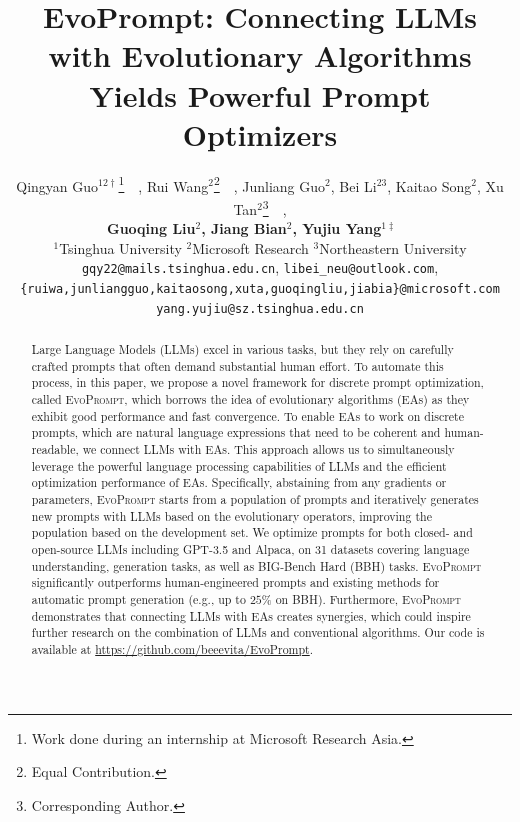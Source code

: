 \documentclass{article} %
\title{EvoPrompt: Connecting LLMs with Evolutionary Algorithms Yields Powerful Prompt Optimizers}
\author{Qingyan Guo$^{12\dag}$\thanks{Work done during an internship at Microsoft Research Asia.
}~~,
Rui Wang$^{2}$\thanks{Equal Contribution.}~~, Junliang Guo$^{2}$, Bei Li$^{23}$, Kaitao Song$^{2}$, Xu Tan$^{2}$\thanks{Corresponding Author.}~~,\\
\textbf{
Guoqing Liu$^{2}$, Jiang Bian$^{2}$, 
Yujiu Yang$^{1\ddag}$~~ } \\
$^1$Tsinghua University\quad 
$^2$Microsoft Research\quad 
$^3$Northeastern University \\
\texttt{gqy22@mails.tsinghua.edu.cn},
\texttt{libei\_neu@outlook.com},\\
\texttt{\{ruiwa,junliangguo,kaitaosong,xuta,guoqingliu,jiabia\}@microsoft.com}\\
\texttt{yang.yujiu@sz.tsinghua.edu.cn}
}
\newcommand{\modelname}{{{\textsc{EvoPrompt}}}\xspace}
\begin{document}
\maketitle

\begin{abstract}












Large Language Models (LLMs) excel in various tasks, but they rely on carefully crafted prompts that often demand substantial human effort. To automate this process, in this paper, we propose a novel framework for discrete prompt optimization, called \modelname, which borrows the idea of evolutionary algorithms (EAs) as they exhibit good performance and fast convergence. To enable EAs to work on discrete prompts, which are natural language expressions that need to be coherent and human-readable, we connect LLMs with EAs. This approach allows us to simultaneously leverage the powerful language processing capabilities of LLMs and the efficient optimization performance of EAs. Specifically, abstaining from any gradients or parameters, \modelname starts from a population of prompts and iteratively generates new prompts with LLMs based on the evolutionary operators, improving the population based on the development set. We optimize prompts for both closed- and open-source LLMs including GPT-3.5 and Alpaca, on 31 datasets covering language understanding, generation tasks, as well as BIG-Bench Hard (BBH) tasks. \modelname significantly outperforms human-engineered prompts and existing methods for automatic prompt generation (e.g., up to $25\%$ on BBH). Furthermore, \modelname demonstrates that connecting LLMs with EAs creates synergies, which could inspire further research on the combination of LLMs and conventional algorithms. 
Our code is available at \url{https://github.com/beeevita/EvoPrompt}.


\end{abstract}













\end{document}
